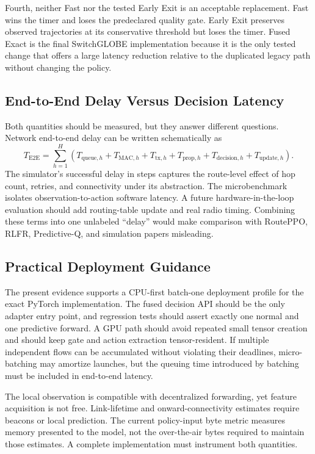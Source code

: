 \documentclass[drones,article,submit,moreauthors]{Definitions/mdpi}
\newcommand{\SG}{SwitchGLOBE}
\begin{document}
Fourth, neither Fast nor the tested Early Exit is an acceptable replacement. Fast wins the timer and loses the predeclared quality gate. Early Exit preserves observed trajectories at its conservative threshold but loses the timer. Fused Exact is the final \SG{} implementation because it is the only tested change that offers a large latency reduction relative to the duplicated legacy path without changing the policy.

\subsection{End-to-End Delay Versus Decision Latency}

Both quantities should be measured, but they answer different questions. Network end-to-end delay can be written schematically as
\begin{equation}
T_{\mathrm{E2E}}=\sum_{h=1}^{H}\left(T_{\mathrm{queue},h}+T_{\mathrm{MAC},h}+T_{\mathrm{tx},h}+T_{\mathrm{prop},h}+T_{\mathrm{decision},h}+T_{\mathrm{update},h}\right).
\end{equation}
The simulator's successful delay in steps captures the route-level effect of hop count, retries, and connectivity under its abstraction. The microbenchmark isolates observation-to-action software latency. A future hardware-in-the-loop evaluation should add routing-table update and real radio timing. Combining these terms into one unlabeled ``delay'' would make comparison with RoutePPO, RLFR, Predictive-Q, and simulation papers misleading.

\subsection{Practical Deployment Guidance}

The present evidence supports a CPU-first batch-one deployment profile for the exact PyTorch implementation. The fused decision API should be the only adapter entry point, and regression tests should assert exactly one normal and one predictive forward. A GPU path should avoid repeated small tensor creation and should keep gate and action extraction tensor-resident. If multiple independent flows can be accumulated without violating their deadlines, micro-batching may amortize launches, but the queuing time introduced by batching must be included in end-to-end latency.

The local observation is compatible with decentralized forwarding, yet feature acquisition is not free. Link-lifetime and onward-connectivity estimates require beacons or local prediction. The current policy-input byte metric measures memory presented to the model, not the over-the-air bytes required to maintain those estimates. A complete implementation must instrument both quantities.
\end{document}
